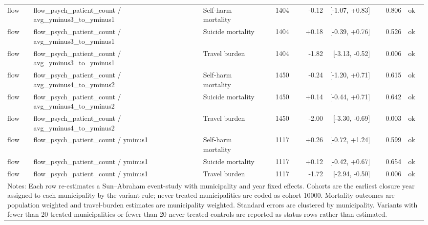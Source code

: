 \begin{table}[!htbp]
{\begin{tabular}{lllrrrrl}
flow & flow\_psych\_patient\_count / avg\_yminus3\_to\_yminus1 & Self-harm mortality & 1404 & -0.12 & [-1.07, +0.83] & 0.806 & ok \\
flow & flow\_psych\_patient\_count / avg\_yminus3\_to\_yminus1 & Suicide mortality & 1404 & +0.18 & [-0.39, +0.76] & 0.526 & ok \\
flow & flow\_psych\_patient\_count / avg\_yminus3\_to\_yminus1 & Travel burden & 1404 & -1.82 & [-3.13, -0.52] & 0.006 & ok \\
flow & flow\_psych\_patient\_count / avg\_yminus4\_to\_yminus2 & Self-harm mortality & 1450 & -0.24 & [-1.20, +0.71] & 0.615 & ok \\
flow & flow\_psych\_patient\_count / avg\_yminus4\_to\_yminus2 & Suicide mortality & 1450 & +0.14 & [-0.44, +0.71] & 0.642 & ok \\
flow & flow\_psych\_patient\_count / avg\_yminus4\_to\_yminus2 & Travel burden & 1450 & -2.00 & [-3.30, -0.69] & 0.003 & ok \\
flow & flow\_psych\_patient\_count / yminus1 & Self-harm mortality & 1117 & +0.26 & [-0.72, +1.24] & 0.599 & ok \\
flow & flow\_psych\_patient\_count / yminus1 & Suicide mortality & 1117 & +0.12 & [-0.42, +0.67] & 0.654 & ok \\
flow & flow\_psych\_patient\_count / yminus1 & Travel burden & 1117 & -1.72 & [-2.94, -0.50] & 0.006 & ok \\
\bottomrule
\multicolumn{8}{p{0.96\textwidth}}{\footnotesize Notes: Each row re-estimates a Sun--Abraham event-study with municipality and year fixed effects. Cohorts are the earliest closure year assigned to each municipality by the variant rule; never-treated municipalities are coded as cohort 10000. Mortality outcomes are population weighted and travel-burden estimates are municipality weighted. Standard errors are clustered by municipality. Variants with fewer than 20 treated municipalities or fewer than 20 never-treated controls are reported as status rows rather than estimated.}\\
\end{tabular}
}%
\end{table}
